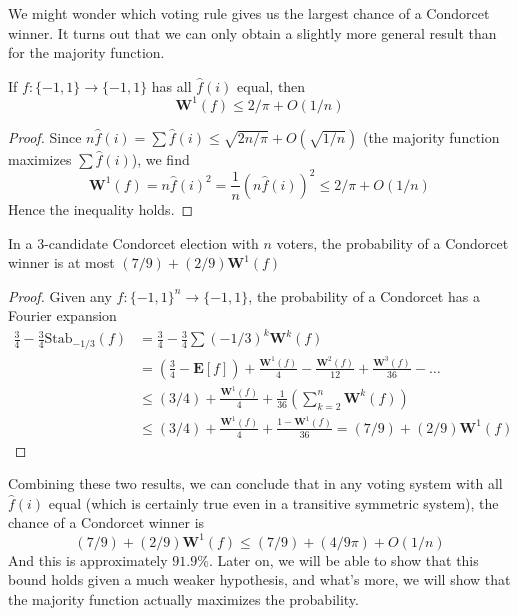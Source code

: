 We might wonder which voting rule gives us the largest chance of a Condorcet winner. It turns out that we can only obtain a slightly more general result than for the majority function.

\begin{lemma}
    If $f: \{ -1, 1 \} \to \{ -1, 1 \}$ has all $\widehat{f}(i)$ equal, then
    \[ \mathbf{W}^1(f) \leq 2/\pi + O(1/n) \]
\end{lemma}
\begin{proof}
    Since $n \widehat{f}(i) = \sum \widehat{f}(i) \leq \sqrt{2n/\pi} + O(\sqrt{1/n})$ (the majority function maximizes $\sum \widehat{f}(i)$), we find
    \[ \mathbf{W}^1(f) = n \widehat{f}(i)^2 = \frac{1}{n} (n \widehat{f}(i))^2 \leq 2/\pi + O(1/n) \]
    Hence the inequality holds.
\end{proof}

\begin{theorem}
    In a 3-candidate Condorcet election with $n$ voters, the probability of a Condorcet winner is at most $(7/9) + (2/9) \mathbf{W}^1(f)$
\end{theorem}
\begin{proof}
    Given any $f: \{ -1, 1 \}^n \to \{ -1, 1 \}$, the probability of a Condorcet has a Fourier expansion
    \begin{align*}
        \frac{3}{4} - \frac{3}{4} \text{Stab}_{-1/3}(f) &= \frac{3}{4} - \frac{3}{4} \sum (-1/3)^k \mathbf{W}^k(f)\\
        &= \left( \frac{3}{4} - \mathbf{E}[f] \right) + \frac{\mathbf{W}^1(f)}{4} - \frac{\mathbf{W}^2(f)}{12} + \frac{\mathbf{W}^3(f)}{36} - \dots\\
        &\leq (3/4) + \frac{\mathbf{W}^1(f)}{4} + \frac{1}{36} \left( \sum_{k = 2}^n \mathbf{W}^{k}(f) \right)\\
        &\leq (3/4) + \frac{\mathbf{W}^1(f)}{4} + \frac{1 - \mathbf{W}^1(f)}{36} = (7/9) + (2/9) \mathbf{W}^1(f)
    \end{align*}
\end{proof}

Combining these two results, we can conclude that in any voting system with all $\widehat{f}(i)$ equal (which is certainly true even in a transitive symmetric system), the chance of a Condorcet winner is
%
\[ (7/9) + (2/9) \mathbf{W}^1(f) \leq (7/9) + (4/9\pi) + O(1/n) \]
%
And this is approximately $91.9\%$. Later on, we will be able to show that this bound holds given a much weaker hypothesis, and what's more, we will show that the majority function actually maximizes the probability.

